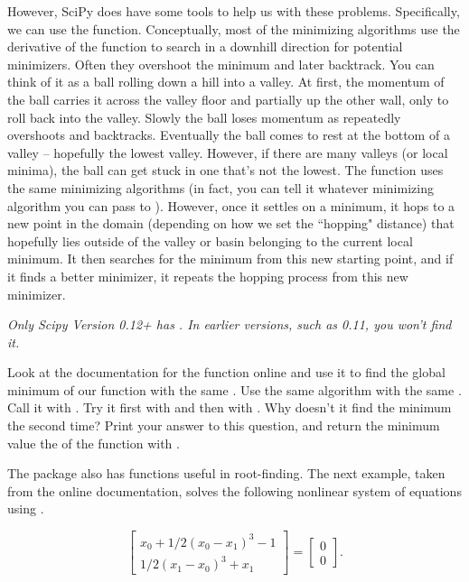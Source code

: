 However, SciPy does have some tools to help us with these problems. Specifically, we can use the  function.
Conceptually, most of the minimizing algorithms use the derivative of the function to search in a downhill direction for potential minimizers.
Often they overshoot the minimum and later backtrack. You can think of it as a ball rolling down a hill into a valley.
At first, the momentum of the ball carries it across the valley floor and partially up the other wall, only to roll back into the valley.
Slowly the ball loses momentum as repeatedly overshoots and backtracks. Eventually the ball comes to rest at the bottom of a valley -- hopefully the lowest valley.
However, if there are many valleys (or local minima), the ball can get stuck in one that's not the lowest.
The  function uses the same minimizing algorithms (in fact, you can tell it whatever minimizing algorithm you can pass to ).
However, once it settles on a minimum, it hops to a new point in the domain (depending on how we set the ``hopping" distance) that hopefully lies outside of the valley
or basin belonging to the current local minimum.
It then searches for the minimum from this new starting point, and if it finds a better minimizer, it repeats the hopping process from this new minimizer.

\emph{Only Scipy Version 0.12+ has . In earlier versions, such as 0.11, you won't find it.}
\begin{problem}

Look at the documentation for the  function online and use it to find the global minimum of our  function with the same .
Use the same  algorithm with the same . Call it with .
Try it first with  and then with . Why doesn't it find the minimum the second time? Print your answer to this question, and
return the minimum value the of the function with .

\end{problem}

The  package also has functions useful in root-finding.
The next example, taken from the online documentation, solves the following nonlinear system of equations using .

\[
\begin{bmatrix}
	x_{0} + 1/2 ( x_{0} - x_{1} )^{3} - 1 \\
	1/2(x_{1}-x_{0})^{3} + x_{1}
\end{bmatrix} =
\begin{bmatrix}
	0 \\
	0
\end{bmatrix}.
\]

